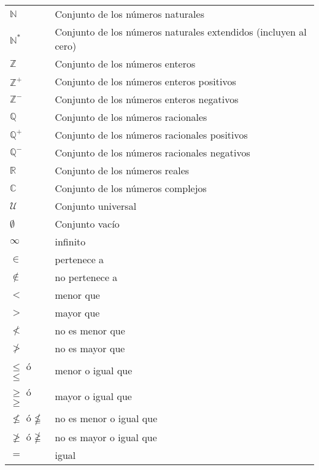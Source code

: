 \chapter*{\notationname}
\pagestyle{especial}
\chaptermark{\notationname}
{}
\begin{longtable}{p{2cm}p{9cm}}
$\mathbb{N}$ & Conjunto de los números naturales \\
$\mathbb{N}^\ast$ & Conjunto de los números naturales extendidos (incluyen al cero)\\
$\mathbb{Z}$ & Conjunto de los números enteros \\
$\mathbb{Z}^+$ & Conjunto de los números enteros positivos\\
$\mathbb{Z}^-$ & Conjunto de los números enteros negativos\\
$\mathbb{Q}$ & Conjunto de los números racionales \\
$\mathbb{Q}^+$ & Conjunto de los números racionales positivos\\
$\mathbb{Q}^-$ & Conjunto de los números racionales negativos\\
$\mathbb{R}$ & Conjunto de los números reales \\
$\mathbb{C}$ & Conjunto de los números complejos \\
$\mathcal{U}$ & Conjunto universal \\
$\emptyset$ & Conjunto vacío \\
$\infty$ & infinito\\
$\in$ & pertenece a \\
$\notin$ & no pertenece a \\
$<$ & menor que \\
$>$ & mayor que \\
$\nless$ & no es menor que \\
$\ngtr$ & no es mayor que \\
$\le$ ó $\leq$ & menor o igual que \\
$\geqslant$ ó $\geq$& mayor o igual que \\
$\nleqslant$ ó $\nleqq$ & no es menor o igual que \\
$\ngeqslant$ ó $\ngeqq$& no es mayor o igual que \\
$=$ & igual \\

\end{longtable}
